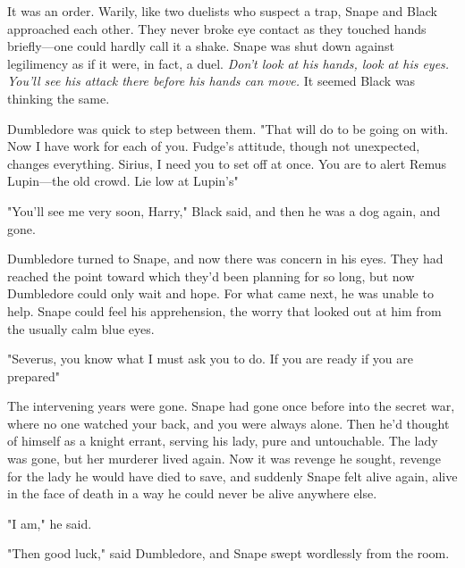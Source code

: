 It was an order. Warily, like two duelists who suspect a trap, Snape and Black approached each other. They never broke eye contact as they touched hands briefly—one could hardly call it a shake. Snape was shut down against legilimency as if it were, in fact, a duel. \emph{Don't look at his hands, look at his eyes. You'll see his attack there before his hands can move.} It seemed Black was thinking the same.

Dumbledore was quick to step between them. "That will do to be going on with. Now I have work for each of you. Fudge's attitude, though not unexpected, changes everything. Sirius, I need you to set off at once. You are to alert Remus Lupin{\el}—the old crowd. Lie low at Lupin's{\el}"

"You'll see me very soon, Harry," Black said, and then he was a dog again, and gone.

Dumbledore turned to Snape, and now there was concern in his eyes. They had reached the point toward which they'd been planning for so long, but now Dumbledore could only wait and hope. For what came next, he was unable to help. Snape could feel his apprehension, the worry that looked out at him from the usually calm blue eyes.

"Severus, you know what I must ask you to do. If you are ready{\el} if you are prepared{\el}"

The intervening years were gone. Snape had gone once before into the secret war, where no one watched your back, and you were always alone. Then he'd thought of himself as a knight errant, serving his lady, pure and untouchable. The lady was gone, but her murderer lived again. Now it was revenge he sought, revenge for the lady he would have died to save, and suddenly Snape felt alive again, alive in the face of death in a way he could never be alive anywhere else.

"I am," he said.

"Then good luck," said Dumbledore, and Snape swept wordlessly from the room.


